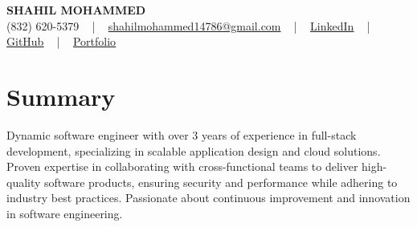 \documentclass[letterpaper,10pt]{article}
\begin{document}
\begin{center}
    {\fontsize{14pt}{12pt}\selectfont \textbf{\MakeUppercase{Shahil Mohammed}}}\\ \vspace{2pt}
    \fontsize{10pt}{12pt}\selectfont (832) 620-5379 ~ | ~ \href{mailto:shahilmohammed14786@gmail.com}{shahilmohammed14786@gmail.com} ~ | ~  
    \href{https://www.linkedin.com/in/shahil-mohammed-9652931a1/}{\color{blue}\underline{LinkedIn}}  ~ | ~ 
    \href{https://github.com/freakbeast14}{\color{blue}\underline{GitHub}} ~ | ~ 
    \href{https://shahil-mohammed.netlify.app/}{\color{blue}\underline{Portfolio}}
    \vspace{-8pt}
\end{center}

\section{Summary}
\vspace{-2pt}\fontsize{8pt}{9pt}\selectfont
Dynamic software engineer with over 3 years of experience in full-stack development, specializing in scalable application design and cloud solutions. Proven expertise in collaborating with cross-functional teams to deliver high-quality software products, ensuring security and performance while adhering to industry best practices. Passionate about continuous improvement and innovation in software engineering.
 \vspace{-5pt}
 
\vspace{-2pt}
\end{document}
